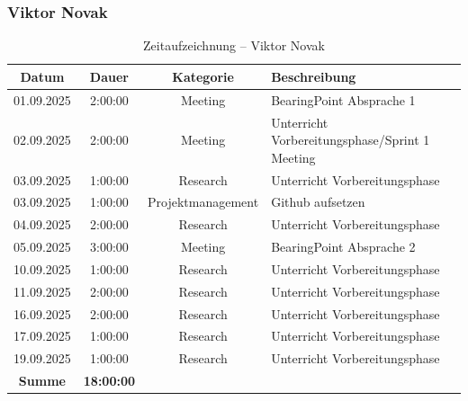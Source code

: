 \documentclass{article}
\begin{document}
\subsubsection*{Viktor Novak}
\begin{table}[H]
  \centering
  \begin{tabularx}{\textwidth}{|c|c|c|X|}
    \hline
    \rowcolor{black!10}\textbf{Datum} & \textbf{Dauer} & \textbf{Kategorie} & \textbf{Beschreibung} \\
    \hline
    01.09.2025 & 2:00:00 & Meeting           & BearingPoint Absprache 1 \\ \hline
    02.09.2025 & 2:00:00 & Meeting           & Unterricht Vorbereitungsphase/Sprint 1 Meeting \\ \hline
    03.09.2025 & 1:00:00 & Research          & Unterricht Vorbereitungsphase \\ \hline
    03.09.2025 & 1:00:00 & Projektmanagement & Github aufsetzen \\ \hline
    04.09.2025 & 2:00:00 & Research          & Unterricht Vorbereitungsphase \\ \hline
    05.09.2025 & 3:00:00 & Meeting           & BearingPoint Absprache 2 \\ \hline
    10.09.2025 & 1:00:00 & Research          & Unterricht Vorbereitungsphase \\ \hline
    11.09.2025 & 2:00:00 & Research          & Unterricht Vorbereitungsphase \\ \hline
    16.09.2025 & 2:00:00 & Research          & Unterricht Vorbereitungsphase \\ \hline
    17.09.2025 & 1:00:00 & Research          & Unterricht Vorbereitungsphase \\ \hline
    19.09.2025 & 1:00:00 & Research          & Unterricht Vorbereitungsphase \\ \hline
    \rowcolor{black!10}\textbf{Summe} & \textbf{18:00:00} & & \\ \hline
  \end{tabularx}
  \caption{Zeitaufzeichnung – Viktor Novak}
  \label{tab:zeit-viktor}
\end{table}
\end{document}
